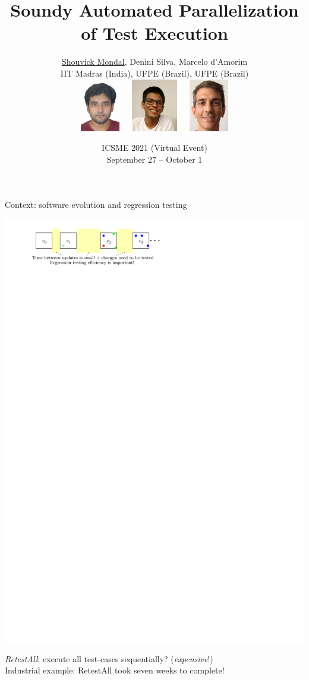 \documentclass{beamer}
\title[\color{white}ICSME 2021 Research Track Presentation.\hspace{14mm}\disp] %
{Soundy Automated Parallelization\\of Test Execution}
\author[Shouvick Mondal \textit{et al}.] %
{\underline{Shouvick Mondal}, Denini Silva, Marcelo d'Amorim\\\vspace{2mm}
{\scriptsize IIT Madras (India), UFPE (Brazil), UFPE (Brazil)}
\\\vspace{2mm}
\includegraphics[width=0.13\textwidth]{images/shouvick2.jpg}~~~\includegraphics[width=0.15\textwidth]{images/denini.jpg}~~~\includegraphics[width=0.13\textwidth]{images/marcelo.jpg}}
\date{ICSME 2021 (Virtual Event)\\{\scriptsize September 27 -- October 1}} %
\begin{document}
\begingroup
\renewcommand{\disp}{}
\begin{frame}
	\titlepage
\end{frame}
\endgroup

\addtocounter{framenumber}{-1}

\begin{frame}{Context: software evolution and regression testing}
\vspace{-3.75mm}
\begin{center}
	{\includegraphics[width=\linewidth]{images/evolution.pdf}}
\end{center}
\vspace{-4mm}
\pause
{\textit{RetestAll}: execute all test-cases sequentially? ({\color{red}\textit{expensive}!})}\pause\\
Industrial example: RetestAll took seven weeks to complete!\footnotemark\\\pause

\end{frame}
\end{document}
